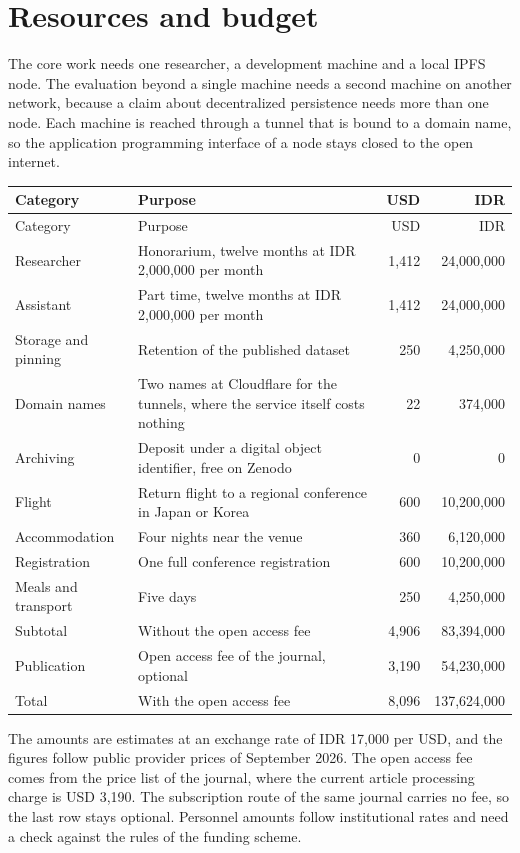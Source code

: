 \documentclass[11pt,a4paper]{article}
\renewcommand{\arraystretch}{1.2}
\begin{document}
\section{Resources and budget}

The core work needs one researcher, a development machine and a local IPFS node. The evaluation beyond a single machine needs a second machine on another network, because a claim about decentralized persistence needs more than one node. Each machine is reached through a tunnel that is bound to a domain name, so the application programming interface of a node stays closed to the open internet.

{\renewcommand{\arraystretch}{1.05}
\begin{longtable}{@{}p{32mm}p{58mm}rr@{}}
\toprule
Category & Purpose & USD & IDR \\
\midrule
\endfirsthead
\toprule
Category & Purpose & USD & IDR \\
\midrule
\endhead
Researcher & Honorarium, twelve months at IDR 2,000,000 per month & 1,412 & 24,000,000 \\
Assistant & Part time, twelve months at IDR 2,000,000 per month & 1,412 & 24,000,000 \\
Storage and pinning & Retention of the published dataset & 250 & 4,250,000 \\
Domain names & Two names at Cloudflare for the tunnels, where the service itself costs nothing & 22 & 374,000 \\
Archiving & Deposit under a digital object identifier, free on Zenodo & 0 & 0 \\
Flight & Return flight to a regional conference in Japan or Korea & 600 & 10,200,000 \\
Accommodation & Four nights near the venue & 360 & 6,120,000 \\
Registration & One full conference registration & 600 & 10,200,000 \\
Meals and transport & Five days & 250 & 4,250,000 \\
\midrule
Subtotal & Without the open access fee & 4,906 & 83,394,000 \\
Publication & Open access fee of the journal, optional & 3,190 & 54,230,000 \\
Total & With the open access fee & 8,096 & 137,624,000 \\
\bottomrule
\end{longtable}}

The amounts are estimates at an exchange rate of IDR 17,000 per USD, and the figures follow public provider prices of September 2026. The open access fee comes from the price list of the journal, where the current article processing charge is USD 3,190. The subscription route of the same journal carries no fee, so the last row stays optional. Personnel amounts follow institutional rates and need a check against the rules of the funding scheme.
\end{document}
